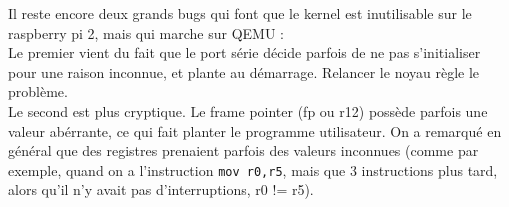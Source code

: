 \documentclass[a4paper]{article}
\begin{document}
Il reste encore deux grands bugs qui font que le kernel est inutilisable sur le
raspberry pi 2, mais qui marche sur QEMU :\\

Le premier vient du fait que le port série décide parfois de ne pas
s'initialiser pour une raison inconnue, et plante au démarrage. Relancer le
noyau règle le problème.\\

Le second est plus cryptique. Le frame pointer (fp ou r12) possède parfois une
valeur abérrante, ce qui fait planter le programme utilisateur. On a remarqué en
général que des registres prenaient parfois des valeurs inconnues (comme par
exemple, quand on a l'instruction \verb!mov r0,r5!, mais que 3 instructions plus
tard, alors qu'il n'y avait pas d'interruptions, r0 != r5).
\end{document}
